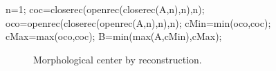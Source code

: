 \begin{matlab}
n=1;
coc=closerec(openrec(closerec(A,n),n),n);
oco=openrec(closerec(openrec(A,n),n),n);
cMin=min(oco,coc);
cMax=max(oco,coc);
B=min(max(A,cMin),cMax);
\end{matlab}

\begin{figure}[htbp]
 \centering
 \hfill
 \hfill
 
 \caption{Morphological center by reconstruction.}
 \label{fig:geodesic_filtering:matlab:center_rec}
\end{figure}